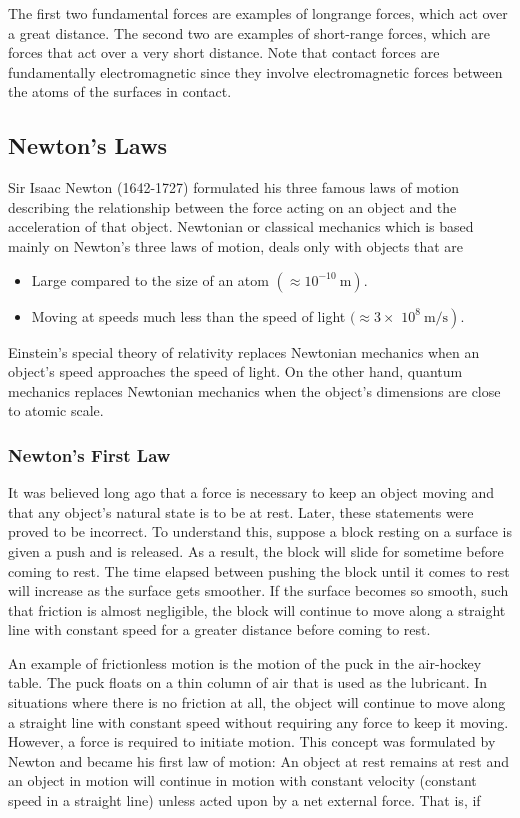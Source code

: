 \documentclass[10pt]{article}
\numberwithin{equation}{section}
\begin{document}
The first two fundamental forces are examples of longrange forces, which act over a great distance. The second two are examples of short-range forces, which are forces that act over a very short distance. Note that contact forces are fundamentally electromagnetic since they involve electromagnetic forces between the atoms of the surfaces in contact.

\subsection{Newton's Laws}\label{sec:3-2}
Sir Isaac Newton (1642-1727) formulated his three famous laws of motion describing the relationship between the force acting on an object and the acceleration of that object. Newtonian or classical mechanics which is based mainly on Newton's three laws of motion, deals only with objects that are

\begin{itemize}
  \item Large compared to the size of an atom $\left(\approx 10^{-10} \mathrm{~m}\right)$.
  \item Moving at speeds much less than the speed of light $(\approx 3 \times$ $\left.10^{8} \mathrm{~m} / \mathrm{s}\right)$.
\end{itemize}

Einstein's special theory of relativity replaces Newtonian mechanics when an object's speed approaches the speed of light. On the other hand, quantum mechanics replaces Newtonian mechanics when the object's dimensions are close to atomic scale.

\subsubsection{Newton's First Law}\label{sec:3-2-1}
It was believed long ago that a force is necessary to keep an object moving and that any object's natural state is to be at rest. Later, these statements were proved to be incorrect. To understand this, suppose a block resting on a surface is given a push and is released. As a result, the block will slide for sometime before coming to rest. The time elapsed between pushing the block until it comes to rest will increase as the surface gets smoother. If the surface becomes so smooth, such that friction is almost negligible, the block will continue to move along a straight line with constant speed for a greater distance before coming to rest.

An example of frictionless motion is the motion of the puck in the air-hockey table. The puck floats on a thin column of air that is used as the lubricant. In situations where there is no friction at all, the object will continue to move along a straight line with constant speed without requiring any force to keep it moving. However, a force is required to initiate motion. This concept was formulated by Newton and became his first law of motion: An object at rest remains at rest and an object in motion will continue in motion with constant velocity (constant speed in a straight line) unless acted upon by a net external force. That is, if
\end{document}
